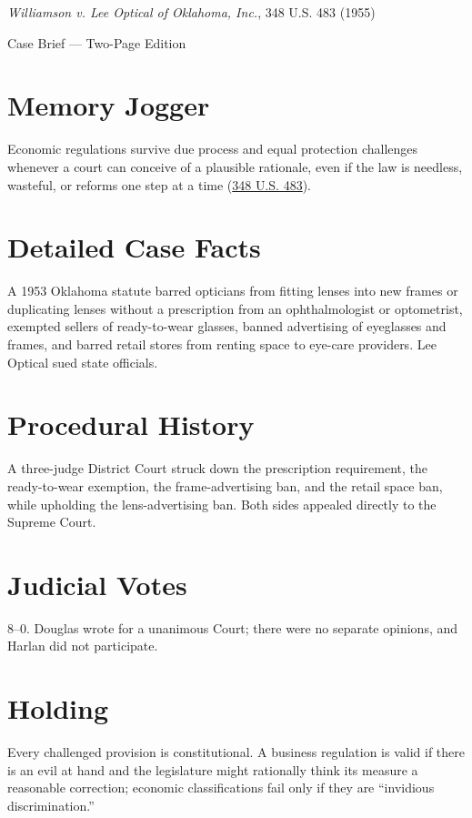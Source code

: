 \documentclass[12pt]{article}
\begin{document}
\begin{center}
{\LARGE \textit{Williamson v. Lee Optical of Oklahoma, Inc.}, 348 U.S. 483 (1955)\par}
\vspace{0.5em}
{\large Case Brief --- Two-Page Edition\par}
\end{center}

\section{Memory Jogger}
Economic regulations survive due process and equal protection challenges whenever a court can conceive of a plausible rationale, even if the law is needless, wasteful, or reforms one step at a time (\href{https://www.courtlistener.com/opinion/105285/williamson-v-lee-optical-of-oklahoma-inc/}{348 U.S. 483}).

\section{Detailed Case Facts}
A 1953 Oklahoma statute barred opticians from fitting lenses into new frames or duplicating lenses without a prescription from an ophthalmologist or optometrist, exempted sellers of ready-to-wear glasses, banned advertising of eyeglasses and frames, and barred retail stores from renting space to eye-care providers. Lee Optical sued state officials.

\section{Procedural History}
A three-judge District Court struck down the prescription requirement, the ready-to-wear exemption, the frame-advertising ban, and the retail space ban, while upholding the lens-advertising ban. Both sides appealed directly to the Supreme Court.

\section{Judicial Votes}
8--0. Douglas wrote for a unanimous Court; there were no separate opinions, and Harlan did not participate.

\section{Holding}
Every challenged provision is constitutional. A business regulation is valid if there is an evil at hand and the legislature might rationally think its measure a reasonable correction; economic classifications fail only if they are ``invidious discrimination.''
\end{document}
